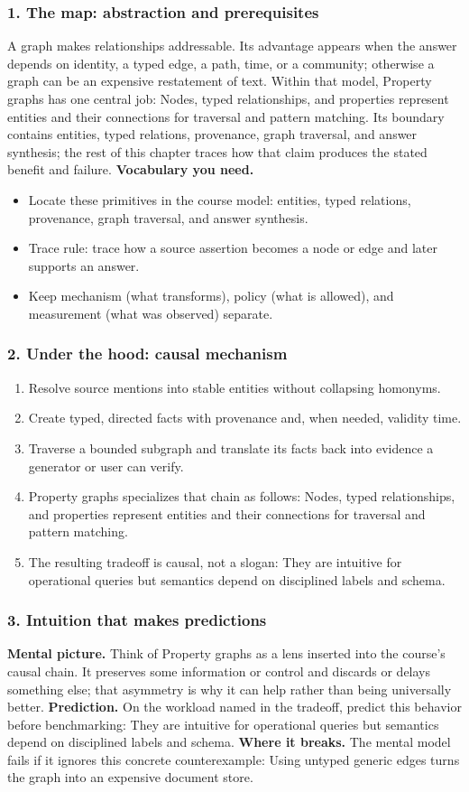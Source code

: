 \subsubsection*{1. The map: abstraction and prerequisites}
A graph makes relationships addressable. Its advantage appears when the answer depends on identity, a typed edge, a path, time, or a community; otherwise a graph can be an expensive restatement of text.
Within that model, Property graphs has one central job: Nodes, typed relationships, and properties represent entities and their connections for traversal and pattern matching. Its boundary contains entities, typed relations, provenance, graph traversal, and answer synthesis; the rest of this chapter traces how that claim produces the stated benefit and failure.
\textbf{Vocabulary you need.}\begin{itemize}
\item Locate these primitives in the course model: entities, typed relations, provenance, graph traversal, and answer synthesis.
\item Trace rule: trace how a source assertion becomes a node or edge and later supports an answer.
\item Keep mechanism (what transforms), policy (what is allowed), and measurement (what was observed) separate.
\end{itemize}
\subsubsection*{2. Under the hood: causal mechanism}\begin{enumerate}
\item Resolve source mentions into stable entities without collapsing homonyms.
\item Create typed, directed facts with provenance and, when needed, validity time.
\item Traverse a bounded subgraph and translate its facts back into evidence a generator or user can verify.
\item Property graphs specializes that chain as follows: Nodes, typed relationships, and properties represent entities and their connections for traversal and pattern matching.
\item The resulting tradeoff is causal, not a slogan: They are intuitive for operational queries but semantics depend on disciplined labels and schema.
\end{enumerate}
\subsubsection*{3. Intuition that makes predictions}
\textbf{Mental picture.} Think of Property graphs as a lens inserted into the course's causal chain. It preserves some information or control and discards or delays something else; that asymmetry is why it can help rather than being universally better.
\textbf{Prediction.} On the workload named in the tradeoff, predict this behavior before benchmarking: They are intuitive for operational queries but semantics depend on disciplined labels and schema.
\textbf{Where it breaks.} The mental model fails if it ignores this concrete counterexample: Using untyped generic edges turns the graph into an expensive document store.
